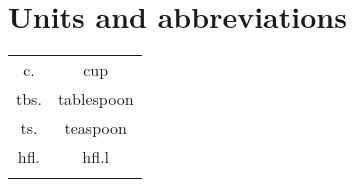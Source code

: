 \section*{Units and abbreviations}
\begin{table}[h]
\centering
\begin{tabular}{cc}
    c.	& cup                     \\
    tbs. & tablespoon                     \\
    ts.	& teaspoon                    \\
    hfl. & hfl.l \\
    \multicolumn{1}{l}{} & \multicolumn{1}{l}{}
\end{tabular}
\end{table}
